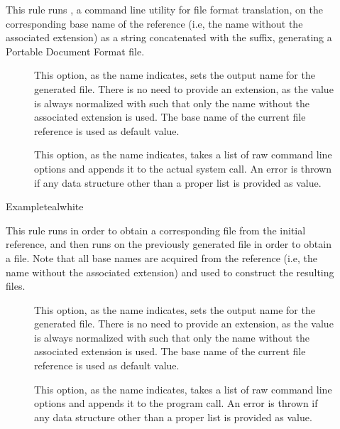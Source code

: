 \begin{description}
\item[] This rule runs , a command line utility for file format translation, on the corresponding base name of the  reference (i.e, the name without the associated extension) as a string concatenated with the  suffix, generating a Portable Document Format  file.

\begin{description}
\item[] This option, as the name indicates, sets the output name for the generated  file. There is no need to provide an extension, as the value is always normalized with  such that only the name without the associated extension is used. The base name of the current file reference is used as default value.

\item[] This option, as the name indicates, takes a list of raw command line options and appends it to the actual system call. An error is thrown if any data structure other than a proper list is provided as value.
\end{description}

\begin{codebox}{Example}{teal}{\icnote}{white}
\end{codebox}

\item[] This rule runs  in order to obtain a corresponding  file from the initial  reference, and then runs  on the previously generated  file in order to obtain a  file. Note that all base names are acquired from the  reference (i.e, the name without the associated extension) and used to construct the resulting files.

\begin{description}
\item[] This option, as the name indicates, sets the output name for the generated  file. There is no need to provide an extension, as the value is always normalized with  such that only the name without the associated extension is used. The base name of the current file reference is used as default value.

\item[] This option, as the name indicates, takes a list of raw command line options and appends it to the  program call. An error is thrown if any data structure other than a proper list is provided as value.


\end{description}
\end{description}
